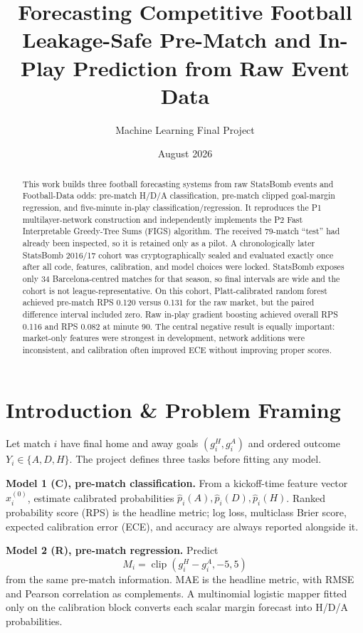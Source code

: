 \documentclass[10pt]{article}
\title{Forecasting Competitive Football\\
\large Leakage-Safe Pre-Match and In-Play Prediction from Raw Event Data}
\author{Machine Learning Final Project}
\date{August 2026}
\begin{document}
\maketitle

\begin{abstract}
This work builds three football forecasting systems from raw StatsBomb events and Football-Data odds: pre-match H/D/A classification, pre-match clipped goal-margin regression, and five-minute in-play classification/regression. It reproduces the P1 multilayer-network construction and independently implements the P2 Fast Interpretable Greedy-Tree Sums (FIGS) algorithm. The received 79-match ``test'' had already been inspected, so it is retained only as a pilot. A chronologically later StatsBomb 2016/17 cohort was cryptographically sealed and evaluated exactly once after all code, features, calibration, and model choices were locked. StatsBomb exposes only 34 Barcelona-centred matches for that season, so final intervals are wide and the cohort is not league-representative. On this cohort, Platt-calibrated random forest achieved pre-match RPS 0.120 versus 0.131 for the raw market, but the paired difference interval included zero. Raw in-play gradient boosting achieved overall RPS 0.116 and RPS 0.082 at minute 90. The central negative result is equally important: market-only features were strongest in development, network additions were inconsistent, and calibration often improved ECE without improving proper scores.
\end{abstract}

\section{Introduction \& Problem Framing}

Let match $i$ have final home and away goals $(g_i^H,g_i^A)$ and ordered outcome $Y_i\in\{A,D,H\}$. The project defines three tasks before fitting any model.

\textbf{Model 1 (C), pre-match classification.} From a kickoff-time feature vector $x_i^{(0)}$, estimate calibrated probabilities $\hat p_i(A),\hat p_i(D),\hat p_i(H)$. Ranked probability score (RPS) is the headline metric; log loss, multiclass Brier score, expected calibration error (ECE), and accuracy are always reported alongside it.

\textbf{Model 2 (R), pre-match regression.} Predict
\[
M_i=\operatorname{clip}(g_i^H-g_i^A,-5,5)
\]
from the same pre-match information. MAE is the headline metric, with RMSE and Pearson correlation as complements. A multinomial logistic mapper fitted only on the calibration block converts each scalar margin forecast into H/D/A probabilities.
\end{document}
